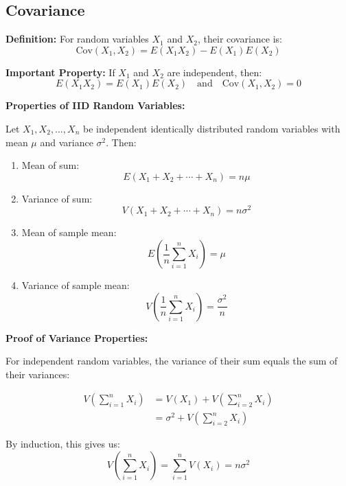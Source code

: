 \documentclass{article}
\begin{document}
    \subsection*{Covariance}

    \noindent
    \textbf{Definition:} For random variables $X_1$ and $X_2$, their covariance is:
    \[
    \text{Cov}(X_1, X_2) = E(X_1X_2) - E(X_1)E(X_2)
    \]

    \noindent
    \textbf{Important Property:} If $X_1$ and $X_2$ are independent, then:
    \[
    E(X_1X_2) = E(X_1)E(X_2) \quad \text{and} \quad \text{Cov}(X_1, X_2) = 0
    \]

    \vspace{1em}
    \noindent
    \textbf{Properties of IID Random Variables:}
    
    Let $X_1, X_2, \ldots, X_n$ be independent identically distributed random variables with mean $\mu$ and variance $\sigma^2$. Then:

    \begin{enumerate}
        \item Mean of sum:
        \[
        E(X_1 + X_2 + \cdots + X_n) = n\mu
        \]

        \item Variance of sum:
        \[
        V(X_1 + X_2 + \cdots + X_n) = n\sigma^2
        \]

        \item Mean of sample mean:
        \[
        E\left(\frac{1}{n}\sum_{i=1}^n X_i\right) = \mu
        \]

        \item Variance of sample mean:
        \[
        V\left(\frac{1}{n}\sum_{i=1}^n X_i\right) = \frac{\sigma^2}{n}
        \]
    \end{enumerate}

    \noindent
    \textbf{Proof of Variance Properties:}

    For independent random variables, the variance of their sum equals the sum of their variances:

    \begin{align*}
        V\left(\sum_{i=1}^n X_i\right) &= V(X_1) + V\left(\sum_{i=2}^n X_i\right) \\
        &= \sigma^2 + V\left(\sum_{i=2}^n X_i\right)
    \end{align*}

    By induction, this gives us:
    \[
    V\left(\sum_{i=1}^n X_i\right) = \sum_{i=1}^n V(X_i) = n\sigma^2
    \]
\end{document}
